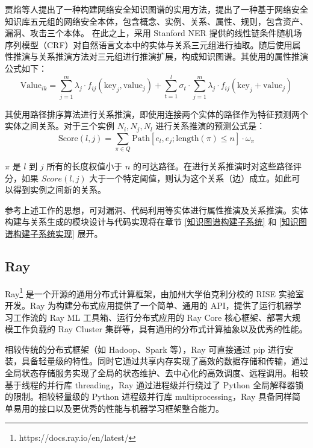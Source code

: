 \documentclass[a4paper,AutoFakeBold,oneside,12pt]{book}
\begin{document}
贾焰等人提出了一种构建网络安全知识图谱的实用方法，提出了一种基于网络安全知识库五元组的网络安全本体，包含概念、实例、关系、属性、规则，包含资产、漏洞、攻击三个本体。\cite{JIA201853} 在此之上，采用 Stanford NER 提供的线性链条件随机场序列模型（CRF）对自然语言文本中的实体与关系三元组进行抽取。随后使用属性推演与关系推演方法对三元组进行推演扩展，构成知识图谱。其使用的属性推演公式如下：
\begin{equation}
	\text{Value}_{ik}=\sum_{j=1}^m \lambda_j \cdot f_{ij}(\text{key}_j, \text{value}_j) + \sum_{t=1}^l \sigma_t \cdot \sum_{j=1}^m \lambda_j \cdot f_{ij}(\text{key}_j + \text{value}_j)
\end{equation}

其使用路径排序算法进行关系推演，即使用连接两个实体的路径作为特征预测两个实体之间关系。对于三个实例 $N_i, N_j, N_l$ 进行关系推演的预测公式是：
\begin{equation}
	\text{Score}(l,j)=\sum_{\pi \in Q} \text{Path}[e_l,e_j;\text{length}(\pi) \le n] \cdot \omega_{\pi}
\end{equation}

$\pi$ 是 $l$ 到 $j$ 所有的长度权值小于 $n$ 的可达路径。在进行关系推演时对这些路径评分，如果 $Score(l,j)$ 大于一个特定阈值，则认为这个关系（边）成立。如此可以得到实例之间新的关系。

参考上述工作的思想，可对漏洞、代码利用等实体进行属性推演及关系推演。实体构建与关系生成的模块设计与代码实现将在章节 \ref{知识图谱构建子系统}  和 \ref{知识图谱构建子系统实现}  展开。

\subsection{Ray}

Ray\footnote{https://docs.ray.io/en/latest/} 是一个开源的通用分布式计算框架，由加州大学伯克利分校的 RISE 实验室开发。Ray 为构建分布式应用提供了一个简单、通用的 API，提供了运行机器学习工作流的 Ray ML 工具箱、运行分布式应用的 Ray Core 核心框架、部署大规模工作负载的 Ray Cluster 集群等，具有通用的分布式计算抽象以及优秀的性能。

相较传统的分布式框架（如 Hadoop、Spark 等），Ray 可直接通过 pip 进行安装，具备轻量级的特性。同时它通过共享内存实现了高效的数据存储和传输，通过全局状态存储服务实现了全局的状态维护、去中心化的高效调度、远程调用。相较基于线程的并行库  threading，Ray 通过进程级并行绕过了 Python 全局解释器锁的限制。相较轻量级的 Python 进程级并行库 multiprocessing，Ray 具备同样简单易用的接口以及更优秀的性能与机器学习框架整合能力。
\end{document}
